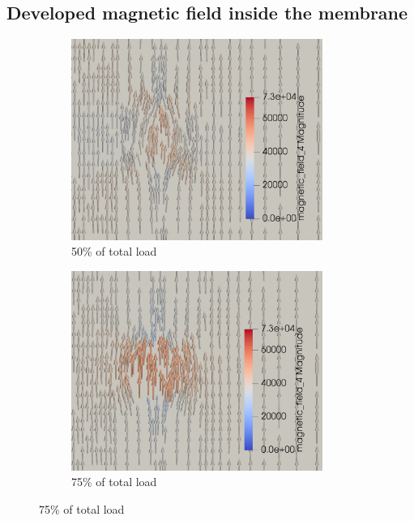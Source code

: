 \documentclass[11pt,a4paper,final]{article}
\begin{document}
\subsection{Developed magnetic field inside the membrane}

\begin{figure}[h]
\centering
\begin{subfigure}{0.32\textwidth}
\centering
\includegraphics[width=0.9\textwidth]{coup_membrane_field_ls_50.png}
\caption{50\% of total load}
\label{fig:3.12.1}
\end{subfigure}
\begin{subfigure}{0.32\textwidth}
\centering
\includegraphics[width=0.9\textwidth]{coup_membrane_field_ls_75.png}
\caption{75\% of total load}
\label{fig:3.12.2}
\end{subfigure}

\end{figure}
\end{document}
